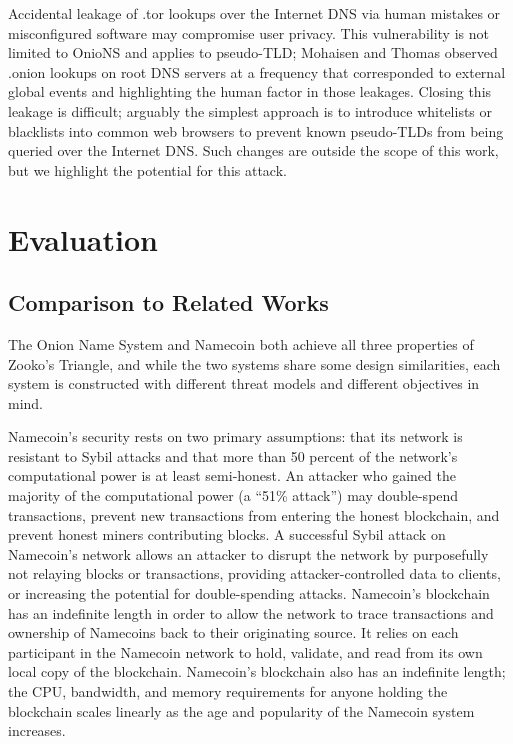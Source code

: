 \documentclass[conference]{IEEEtran}
\begin{document}
Accidental leakage of .tor lookups over the Internet DNS via human mistakes or misconfigured software may compromise user privacy. This vulnerability is not limited to OnioNS and applies to pseudo-TLD; Mohaisen and Thomas observed .onion lookups on root DNS servers at a frequency that corresponded to external global events and highlighting the human factor in those leakages\cite{thomasmeasuring}. Closing this leakage is difficult; arguably the simplest approach is to introduce whitelists or blacklists into common web browsers to prevent known pseudo-TLDs from being queried over the Internet DNS. Such changes are outside the scope of this work, but we highlight the potential for this attack.

\section{Evaluation}
\label{sec:eval}

\subsection{Comparison to Related Works}

The Onion Name System and Namecoin both achieve all three properties of Zooko's Triangle, and while the two systems share some design similarities, each system is constructed with different threat models and different objectives in mind.

Namecoin's security rests on two primary assumptions: that its network is resistant to Sybil attacks and that more than 50 percent of the network's computational power is at least semi-honest. An attacker who gained the majority of the computational power (a ``51\% attack'') may double-spend transactions, prevent new transactions from entering the honest blockchain, and prevent honest miners contributing blocks. A successful Sybil attack on Namecoin's network allows an attacker to disrupt the network by purposefully not relaying blocks or transactions, providing attacker-controlled data to clients, or increasing the potential for double-spending attacks. Namecoin's blockchain has an indefinite length in order to allow the network to trace transactions and ownership of Namecoins back to their originating source. It relies on each participant in the Namecoin network to hold, validate, and read from its own local copy of the blockchain. Namecoin's blockchain also has an indefinite length; the CPU, bandwidth, and memory requirements for anyone holding the blockchain scales linearly as the age and popularity of the Namecoin system increases.
\end{document}
